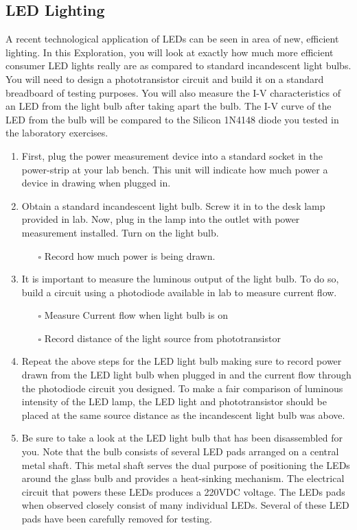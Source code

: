 \documentclass[12pt]{../manual}
\begin{document}
\subsection{LED Lighting}
A recent technological application of LEDs can be seen in area of new, efficient lighting. In this Exploration, you will look at exactly how much more efficient consumer LED lights really are as compared to standard incandescent light bulbs. You will need to design a phototransistor circuit and build it on a standard breadboard of testing purposes. You will also measure the I-V characteristics of an LED from the light bulb after taking apart the bulb. The I-V curve of the LED from the bulb will be compared to the Silicon 1N4148 diode you tested in the laboratory exercises.
\begin{enumerate}
\item First, plug the power measurement device into a standard socket in the power-strip at your lab bench. This unit will indicate how much power a device in drawing when plugged in.
\item Obtain a standard incandescent light bulb. Screw it in to the desk lamp provided in lab. Now, plug in the lamp into the outlet with power measurement installed. Turn on the light bulb.
\begin{itemize}
\item[$\square$] Record how much power is being drawn.
\end{itemize}
\item It is important to measure the luminous output of the light bulb. To do so, build a circuit using a photodiode available in lab to measure current flow.
\begin{itemize}
\item[$\square$] Measure Current flow when light bulb is on
\item[$\square$] Record distance of the light source from phototransistor
\end{itemize}
\item Repeat the above steps for the LED light bulb making sure to record power drawn from the LED light bulb when plugged in and the current flow through the photodiode circuit you designed. To make a fair comparison of luminous intensity of the LED lamp, the LED light and phototransistor should be placed at the same source distance as the incandescent light bulb was above.
\item Be sure to take a look at the LED light bulb that has been disassembled for you. Note that the bulb consists of several LED pads arranged on a central metal shaft. This metal shaft serves the dual purpose of positioning the LEDs around the glass bulb and provides a heat-sinking mechanism. The electrical circuit that powers these LEDs produces a 220VDC voltage. The LEDs pads when observed closely consist of many individual LEDs. Several of these LED pads have been carefully removed for testing.
\end{enumerate}
\end{document}
